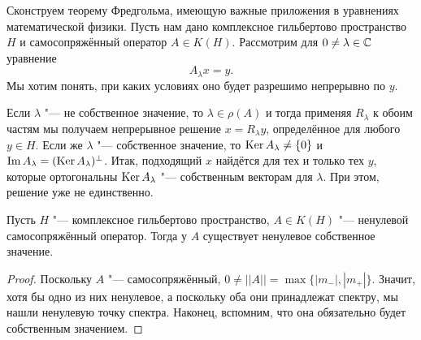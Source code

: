 \documentclass[main]{subfiles}
\begin{document}
Сконструем теорему Фредгольма, имеющую
важные приложения в уравнениях математической физики.
Пусть нам дано комплексное гильбертово пространство
\( H \) и самосопряжённый оператор \( A \in K(H) \).
Рассмотрим для \( 0 \ne \lambda \in \mathbb{C} \) уравнение
\[
  A_\lambda x = y.
\]
Мы хотим понять, при каких условиях оно будет
разрешимо непрерывно по \( y \).

Если \( \lambda \) "--- не собственное значение,
то \( \lambda \in \rho(A) \) и тогда
применяя \( R_\lambda \) к обоим частям мы получаем
непрерывное решение \( x = R_\lambda y \), определённое
для любого \( y \in H \).
Если же \( \lambda \) "--- собственное значение,
то \( \operatorname{Ker} A_\lambda \ne \{ 0 \} \)
и \( \operatorname{Im} A_\lambda = (\operatorname{Ker} A_\lambda)^\perp \).
Итак, подходящий \( x \) найдётся для тех и только тех
\( y \), которые ортогональны \( \operatorname{Ker} A_\lambda \) "---
собственным векторам для \( \lambda \).
При этом, решение уже не единственно.

\begin{lemma}\label{thm:ksco-eigenvalue}
  Пусть \( H \) "--- комплексное гильбертово пространство,
  \( A \in K(H) \) "--- ненулевой самосопряжённый оператор.
  Тогда у \( A \) существует ненулевое собственное значение.
\end{lemma}
\begin{proof}
  Поскольку \( A \) "--- самосопряжённый,
  \( 0 \ne ||A|| = \max \{ |m_-|, |m_+| \} \).
  Значит, хотя бы одно из них ненулевое,
  а поскольку оба они принадлежат спектру,
  мы нашли ненулевую точку спектра. Наконец,
  вспомним, что она обязательно будет
  собственным значением.
\end{proof}
\end{document}
